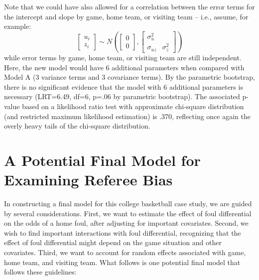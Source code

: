 \documentclass[
]{krantz}
\begin{document}
Note that we could have also allowed for a correlation between the error terms for the intercept and slope by game, home team, or visiting team -- i.e., assume, for example:
\[ \left[ \begin{array}{c}
            u_{i} \\ z_{i}
          \end{array}  \right] \sim N \left( \left[
          \begin{array}{c}
            0 \\ 0
          \end{array} \right], \left[
          \begin{array}{cc}
            \sigma_{u}^{2} & \\
            \sigma_{uz} & \sigma_{z}^{2}
          \end{array} \right] \right) \]
while error terms by game, home team, or visiting team are still independent. Here, the new model would have 6 additional parameters when compared with Model A (3 variance terms and 3 covariance terms). By the parametric bootstrap, there is no significant evidence that the model with 6 additional parameters is necessary (LRT=6.49, df=6, p=.06 by parametric bootstrap). The associated p-value based on a likelihood ratio test with approximate chi-square distribution (and restricted maximum likelihood estimation) is .370, reflecting once again the overly heavy tails of the chi-square distribution.

\hypertarget{sec:finalmodel-glmm}{%
\section{A Potential Final Model for Examining Referee Bias}\label{sec:finalmodel-glmm}}

In constructing a final model for this college basketball case study, we are guided by several considerations. First, we want to estimate the effect of foul differential on the odds of a home foul, after adjusting for important covariates. Second, we wish to find important interactions with foul differential, recognizing that the effect of foul differential might depend on the game situation and other covariates. Third, we want to account for random effects associated with game, home team, and visiting team. What follows is one potential final model that follows these guidelines:
\end{document}

